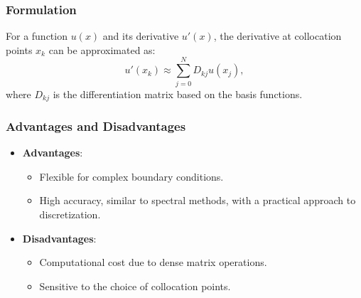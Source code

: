 \documentclass[12pt]{report} %
\begin{document}
\subsubsection{Formulation}
For a function \( u(x) \) and its derivative \( u'(x) \), the derivative at collocation points \( x_k \) can be approximated as:
\[
u'(x_k) \approx \sum_{j=0}^{N} D_{kj} u(x_j),
\]
where \( D_{kj} \) is the differentiation matrix based on the basis functions.

\subsubsection{Advantages and Disadvantages}
\begin{itemize}
    \item \textbf{Advantages}:
    \begin{itemize}
        \item Flexible for complex boundary conditions.
        \item High accuracy, similar to spectral methods, with a practical approach to discretization.
    \end{itemize}
    \item \textbf{Disadvantages}:
    \begin{itemize}
        \item Computational cost due to dense matrix operations.
        \item Sensitive to the choice of collocation points.
    \end{itemize}
\end{itemize}
\end{document}
